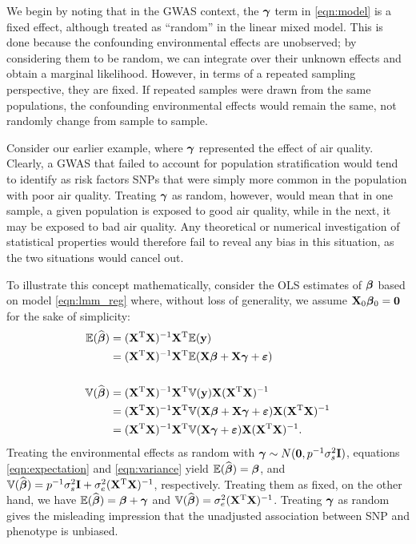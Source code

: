 We begin by noting that in the GWAS context, the $\boldsymbol{\gamma}$ term in \eqref{eqn:model} is a fixed effect, although treated as ``random'' in the linear mixed model.  This is done because the confounding environmental effects are unobserved; by considering them to be random, we can integrate over their unknown effects and obtain a marginal likelihood.  However, in terms of a repeated sampling perspective, they are fixed.  If repeated samples were drawn from the same populations, the confounding environmental effects would remain the same, not randomly change from sample to sample.  

Consider our earlier example, where $\boldsymbol{\gamma}$ represented the effect of air quality.  Clearly, a GWAS that failed to account for population stratification would tend to identify as risk factors SNPs that were simply more common in the population with poor air quality.  Treating $\boldsymbol{\gamma}$ as random, however, would mean that in one sample, a given population is exposed to good air quality, while in the next, it may be exposed to bad air quality.  Any theoretical or numerical investigation of statistical properties would therefore fail to reveal any bias in this situation, as the two situations would cancel out.

To illustrate this concept mathematically, consider the OLS estimates of $\boldsymbol{\beta}{}$ based on model \eqref{eqn:lmm_reg} where, without loss of generality, we assume $\mathbf{X}_0 \boldsymbol{\beta}{}_0 = \boldsymbol{0}$ for the sake of simplicity: 
\begin{align}
    \mathbb{E}(\widehat{\boldsymbol{\beta}{}}) &= (\mathbf{X}^{\text{T}} \mathbf{X})^{-1} \mathbf{X}^{\text{T}} \mathbb{E}(\mathbf{y}) \notag \\
    &=  (\mathbf{X}^{\text{T}} \mathbf{X})^{-1} \mathbf{X}^{\text{T}} \mathbb{E}(\mathbf{X}\boldsymbol{\beta}{} + \mathbf{X}\boldsymbol{\gamma} + \boldsymbol{\varepsilon}{}) \label{eqn:expectation}\\
    &\quad \notag\\
    \mathbb{V}(\widehat{\boldsymbol{\beta}{}}) &= (\mathbf{X}^{\text{T}} \mathbf{X})^{-1} \mathbf{X}^{\text{T}} \mathbb{V}(\mathbf{y}) \mathbf{X}  (\mathbf{X}^{\text{T}} \mathbf{X})^{-1} \notag\\
    &=  (\mathbf{X}^{\text{T}} \mathbf{X})^{-1} \mathbf{X}^{\text{T}} \mathbb{V}(\mathbf{X}\boldsymbol{\beta}{} + \mathbf{X}\boldsymbol{\gamma} + \boldsymbol{\varepsilon}{}) \mathbf{X}  (\mathbf{X}^{\text{T}} \mathbf{X})^{-1} \notag\\
    &=  (\mathbf{X}^{\text{T}} \mathbf{X})^{-1} \mathbf{X}^{\text{T}} \mathbb{V}(\mathbf{X}\boldsymbol{\gamma} + \boldsymbol{\varepsilon}{}) \mathbf{X}  (\mathbf{X}^{\text{T}} \mathbf{X})^{-1} \label{eqn:variance}.
\end{align}
Treating the environmental effects as random with $\boldsymbol{\gamma} \sim N(\boldsymbol{0}, p^{-1} \sigma^2_s \mathbf{I})$, equations \eqref{eqn:expectation} and \eqref{eqn:variance} yield $\mathbb{E}(\widehat{\boldsymbol{\beta}{}}) = \boldsymbol{\beta}{}$, and $\mathbb{V}(\widehat{\boldsymbol{\beta}{}}) = p^{-1}\sigma^2_s\mathbf{I} + \sigma^2_e (\mathbf{X}^{\text{T}} \mathbf{X})^{-1}$, respectively. Treating them as fixed, on the other hand, we have $\mathbb{E}(\widehat{\boldsymbol{\beta}{}}) = \boldsymbol{\beta}{} + \boldsymbol{\gamma}$ and $\mathbb{V}(\widehat{\boldsymbol{\beta}{}}) = \sigma^2_e (\mathbf{X}^{\text{T}} \mathbf{X})^{-1}$. Treating $\boldsymbol{\gamma}$ as random gives the misleading impression that the unadjusted association between SNP and phenotype is unbiased.

